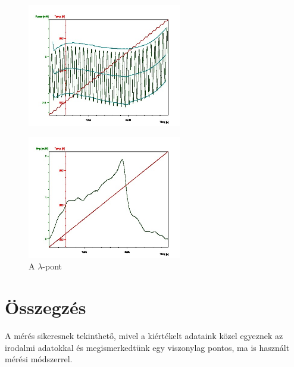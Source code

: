 \documentclass[a4paper,12pt]{article}
\begin{document}
\begin{figure}[H]
\centering
\includegraphics[width=0.6\textwidth]{13outs.jpg}
\end{figure}

\begin{figure}[H]
\centering
\includegraphics[width=0.6\textwidth]{14outs.jpg}
\caption{ A $\lambda$-pont}
\end{figure}

\section{Összegzés}

\par A mérés sikeresnek tekinthető, mivel a kiértékelt adataink közel egyeznek az irodalmi adatokkal és megismerkedtünk egy viszonylag pontos, ma is használt mérési módszerrel.
\end{document}
